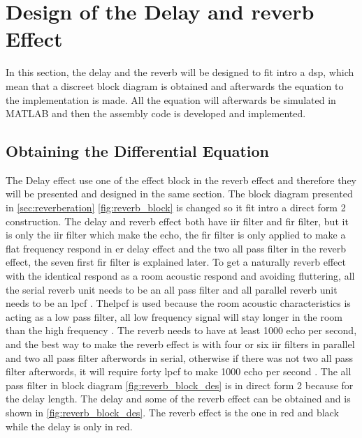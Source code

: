 \section{Design of the Delay and \gls{reverb} Effect}
In this section, the delay and the \gls{reverb} will be designed to fit intro a \gls{dsp}, which mean that a discreet block diagram is obtained and afterwards the equation to the implementation is made. All the equation will afterwards be simulated in MATLAB and then the assembly code is developed and implemented. 


\subsection{Obtaining the Differential Equation}
The Delay effect use one of the effect block in the \gls{reverb} effect and therefore they will be presented and designed in the same section. The block diagram presented in \autoref{sec:reverberation} \autoref{fig:reverb_block} is changed so it fit intro a direct form 2 construction. 
The delay and \gls{reverb} effect both have \gls{iir} filter and \gls{fir} filter, but it is only the \gls{iir} filter which make the echo, the \gls{fir} filter is only applied to make a flat frequency respond in er delay effect and the two all pass filter in the \gls{reverb} effect, the seven first \gls{fir} filter is explained later. To get a naturally \gls{reverb} effect with the identical respond as a room acoustic respond and avoiding fluttering, all the serial \gls{reverb} unit needs to be an all pass filter and all parallel \gls{reverb} unit needs to be an \gls{lpcf} \citep{LPCF}. The\gls{lpcf} is used because the room acoustic characteristics is acting as a low pass filter, all low frequency signal will stay longer in the room than the high frequency \citep{rfi}. The \gls{reverb} needs to have at least 1000 echo per second, and the best way to make the \gls{reverb} effect is with four or six \gls{iir} filters in parallel and two all pass filter afterwords in serial, otherwise if there was not two all pass filter afterwords, it will require forty \gls{lpcf} to make 1000 echo per second \citep{natural_sounding_revorb}. The all pass filter in block diagram \autoref{fig:reverb_block_des} is in direct form 2 because for the delay length. The delay and some of the \gls{reverb} effect can be obtained and is shown in \autoref{fig:reverb_block_des}. The \gls{reverb} effect is the one in red and black while the delay is only in red. 

\newpage

